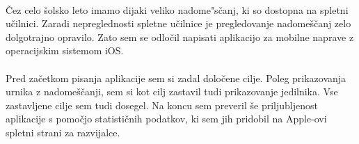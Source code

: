 \paragraph{} Čez celo šolsko leto imamo dijaki veliko nadome"sčanj, ki so dostopna na spletni učilnici. Zaradi nepreglednosti spletne učilnice je pregledovanje nadomeščanj zelo dolgotrajno opravilo. Zato sem se odločil napisati aplikacijo za mobilne naprave z operacijskim sistemom iOS.

\paragraph{} Pred začetkom pisanja aplikacije sem si zadal določene cilje. Poleg prikazovanja urnika z nadomeščanji, sem si kot cilj zastavil tudi prikazovanje jedilnika. Vse zastavljene cilje sem tudi dosegel. Na koncu sem preveril še priljubljenost aplikacije s pomočjo statističnih podatkov, ki sem jih pridobil na Apple-ovi spletni strani za razvijalce.